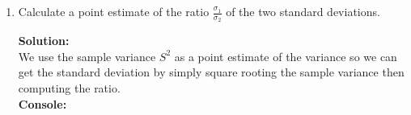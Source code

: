 \documentclass[12pt]{article}
\makeatletter
\theoremstyle{homework}
\newenvironment{exercise}[1]
{\def\@currentlabel{#1}\exercisecore}
{\endexercisecore}
\newcommand{\localhead}[1]{\par\smallskip\noindent\textbf{#1}\nobreak\\}%
\newcommand\solution{\localhead{Solution:}}
\makeatother
\begin{document}
\begin{exercise}{6.4}
\begin{enumerate}
   \item Calculate a  point  estimate  of  the  ratio  $\frac{\sigma_1}{\sigma_2}$ of the two standard deviations.\\
   \solution We use the sample variance $S^2$ as a point estimate of the variance so we can get the standard deviation by 
   simply square rooting the sample variance then computing the ratio. \\

  \textbf{Console:}
  \begin{center}
   
  \end{center}
\end{enumerate}
\end{exercise}
\vspace{.5in}
\end{document}
